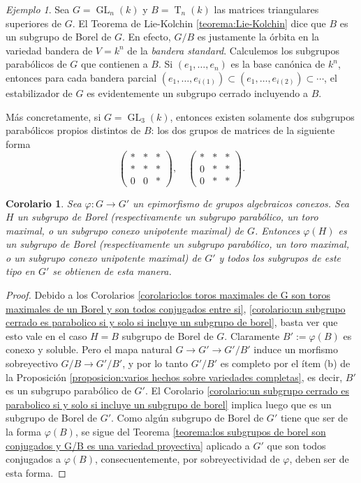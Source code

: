 \documentclass[spanish,10pt]{amsart}
\newtheorem{corollary}[theorem]{Corolario}
\theoremstyle{definition}
\theoremstyle{remark}
\newtheorem{example}[theorem]{Ejemplo}
\numberwithin{equation}{section}
\begin{document}
\begin{example}
Sea $G = \operatorname{GL}_n (k)$ y $B = \operatorname{T}_n (k)$ las matrices triangulares superiores de $G$. El Teorema de Lie-Kolchin \ref{teorema:Lie-Kolchin} dice que $B$ es un subgrupo de Borel de $G$. En efecto, $G/B$ es justamente la órbita en la variedad bandera de $V = k^n$ de la \textit{bandera standard}. Calculemos los subgrupos parabólicos de $G$ que contienen a $B$. Si $(e_1, \ldots, e_n)$ es la base canónica de $k^n$, entonces para cada bandera parcial $(e_1, \ldots, e_{i(1)}) \subset (e_1, \ldots, e_{i(2)}) \subset \cdots$, el estabilizador de $G$ es evidentemente un subgrupo cerrado incluyendo a $B$.

Más concretamente, si $G = \operatorname{GL}_3 (k)$, entonces existen solamente dos subgrupos parabólicos propios distintos de $B$: los dos grupos de matrices de la siguiente forma
\[
    \begin{pmatrix}
    * &* & * \\
    * & * & * \\
    0 & 0 & *
    \end{pmatrix}, \quad
    \begin{pmatrix}
    * &* & * \\
    0 & * & * \\
    0 & * & *
    \end{pmatrix}.
\]
\end{example}

\begin{corollary}\label{corolario:los epimorfismos preservan subgrupos}
Sea $\varphi : G \to G'$ un epimorfismo de grupos algebraicos conexos. Sea $H$ un subgrupo de Borel (respectivamente un subgrupo parabólico, un toro maximal, o un subgrupo conexo unipotente maximal) de $G$. Entonces $\varphi (H)$ es un subgrupo  de Borel (respectivamente un subgrupo parabólico, un toro maximal, o un subgrupo conexo unipotente maximal) de $G'$ y todos los subgrupos de este tipo en $G'$ se obtienen de esta manera.
\end{corollary}
\begin{proof}
Debido a los Corolarios \ref{corolario:los toros maximales de G son toros maximales de un Borel y son todos conjugados entre si}, \ref{corolario:un subgrupo cerrado es parabolico si y solo si incluye un subgrupo de borel}, basta ver que esto vale en el caso $H = B$ subgrupo de Borel de $G$. Claramente $B' := \varphi (B)$ es conexo y soluble. Pero el mapa natural $G \to G' \to G'/B'$ induce un morfismo sobreyectivo $G/B \to G'/B'$, y por lo tanto $G'/B'$ es completo por el ítem (b) de la Proposición \ref{proposicion:varios hechos sobre variedades completas}, es decir, $B'$ es un subgrupo parabólico de $G'$. El Corolario \ref{corolario:un subgrupo cerrado es parabolico si y solo si incluye un subgrupo de borel} implica luego que es un subgrupo de Borel de $G'$. Como algún subgrupo de Borel de $G'$ tiene que ser de la forma $\varphi (B)$, se sigue del Teorema \ref{teorema:los subgrupos de borel son conjugados y G/B es una variedad proyectiva} aplicado a $G'$ que son todos conjugados a $\varphi (B)$, consecuentemente, por sobreyectividad de $\varphi$, deben ser de esta forma.
\end{proof}
\end{document}
